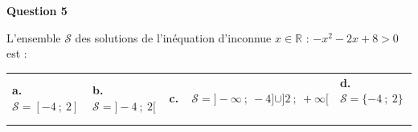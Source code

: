 \documentclass[10pt]{article}
\providecommand{\R}{\mathbb{R}}
\begin{document}
\medskip

\textbf{Question 5}

\medskip

L’ensemble  $\mathcal{S}$ des solutions de l’inéquation d’inconnue $x\in\R$ : $-x^2-2x+8>0$ est :

\medskip

\begin{tabularx}{\linewidth}{*{4}{X}}
\textbf{a.~~} $\mathcal{S} = [-4~;~2]$&\textbf{b.~~} $\mathcal{S}=]-4~;~2[$&\textbf{c.~~}\footnotesize $\mathcal{S} = ]-\infty~;~-4]\cup]2~;~+\infty[$&\textbf{d.~~}  $\mathcal{S} = \{-4~;~2\}$\
\end{tabularx}

\vspace{0,5cm}
\end{document}
